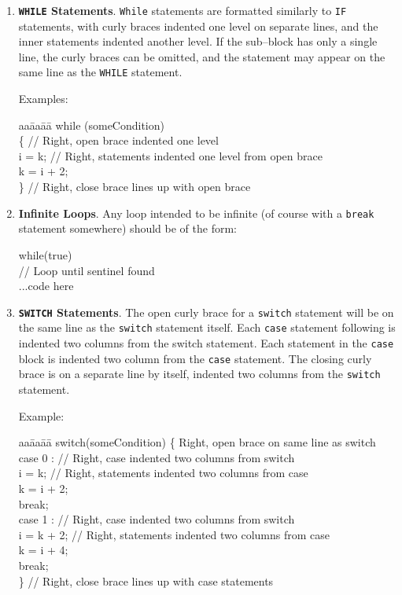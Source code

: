 \documentclass[11pt]{article}
\begin{document}
\begin{enumerate}
\item {\bf {\tt WHILE} Statements}.
{\tt While} statements are formatted similarly to {\tt IF} statements,
with curly braces indented one level on separate lines, and the
inner statements indented another level. If the sub--block has only
a single line, the curly braces can be omitted, and the statement may
appear on the same line as the {\tt WHILE} statement.

Examples:

\begin{tt}
\begin{tabbing}
aa\=aa\=aa\= \kill
while (someCondition) \\
\>\{ // Right, open brace indented one level \\
\>\>i = k; // Right, statements indented one level from open brace \\
\>\>k = i + 2;\\
\>\}       // Right, close brace lines up with open brace
\end{tabbing}
\end{tt}

\item {\bf Infinite Loops}.
Any loop intended to be infinite (of course with a {\tt break} statement
somewhere) should be of the form:

\begin{tt}
while(true) \\
  { // Loop until sentinel found\\
    ...code here \\
  }
\end{tt}

\item {\bf {\tt SWITCH} Statements}.
The open curly brace for a {\tt switch} statement will be on the same
line as the {\tt switch} statement itself.  Each {\tt case} statement
following is indented two columns from the switch statement.  Each
statement in the {\tt case} block is indented two column from the
{\tt case} statement.  The closing curly brace is on a separate line
by itself, indented two columns from the {\tt switch} statement.

Example:

\begin{tt}
\begin{tabbing}
aa\=aa\=aa\= \kill
switch(someCondition) \{ Right, open brace on same line as switch\\
\>case 0 : // Right, case indented two columns from switch\\
\>\>i = k; // Right, statements indented two columns from case \\
\>\>k = i + 2;\\
\>\>break;\\
\>case 1 : // Right, case indented two columns from switch\\
\>\>i = k + 2; // Right, statements indented two columns from case \\
\>\>k = i + 4;\\
\>\>break;\\
\>\}       // Right, close brace lines up with case statements
\end{tabbing}
\end{tt}


\end{enumerate}
\end{document}
